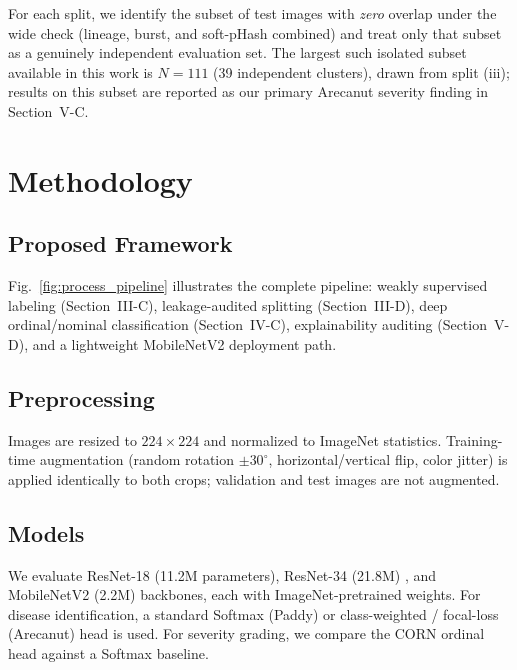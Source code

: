 \documentclass[conference]{IEEEtran}
\begin{document}
For each split, we identify the subset of test images with \emph{zero} overlap under the wide check (lineage, burst, and soft-pHash combined) and treat only that subset as a genuinely independent evaluation set. The largest such isolated subset available in this work is $N=111$ (39 independent clusters), drawn from split (iii); results on this subset are reported as our primary Arecanut severity finding in Section~V-C.

\section{Methodology}

\subsection{Proposed Framework}
Fig.~\ref{fig:process_pipeline} illustrates the complete pipeline: weakly supervised labeling (Section~III-C), leakage-audited splitting (Section~III-D), deep ordinal/nominal classification (Section~IV-C), explainability auditing (Section~V-D), and a lightweight MobileNetV2 deployment path.

\subsection{Preprocessing}
Images are resized to $224\times224$ and normalized to ImageNet statistics. Training-time augmentation (random rotation $\pm30^\circ$, horizontal/vertical flip, color jitter) is applied identically to both crops; validation and test images are not augmented.

\subsection{Models}
We evaluate ResNet-18 (11.2M parameters), ResNet-34 (21.8M) \cite{he2016deep}, and MobileNetV2 (2.2M) \cite{sandler2018mobilenetv2} backbones, each with ImageNet-pretrained weights. For disease identification, a standard Softmax (Paddy) or class-weighted / focal-loss \cite{lin2017focal} (Arecanut) head is used. For severity grading, we compare the CORN ordinal head against a Softmax baseline.
\end{document}
